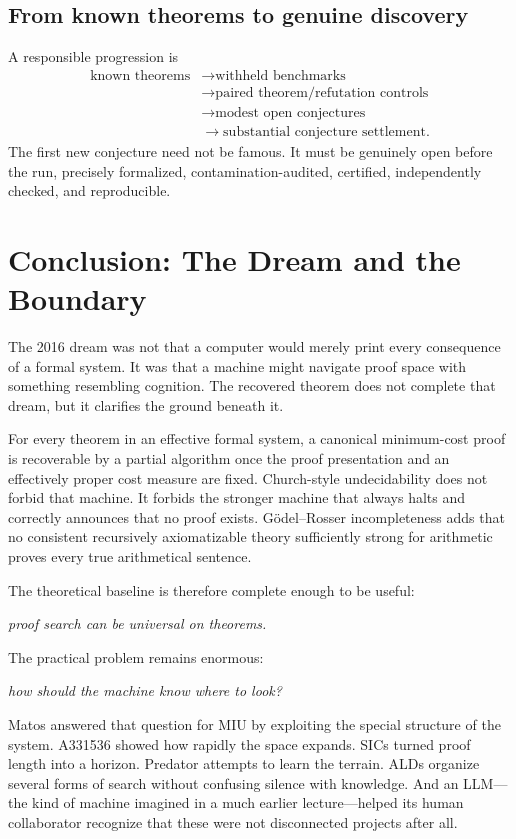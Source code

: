 \documentclass[11pt,oneside]{book}
\theoremstyle{definition}
\theoremstyle{remark}
\begin{document}
\section{From known theorems to genuine discovery}
A responsible progression is
\[
\begin{aligned}
\text{known theorems} &\longrightarrow \text{withheld benchmarks}\\
&\longrightarrow \text{paired theorem/refutation controls}\\
&\longrightarrow \text{modest open conjectures}\\
&\longrightarrow \text{substantial conjecture settlement}.
\end{aligned}
\]
The first new conjecture need not be famous. It must be genuinely open before the run, precisely formalized, contamination-audited, certified, independently checked, and reproducible.

\chapter{Conclusion: The Dream and the Boundary}
The 2016 dream was not that a computer would merely print every consequence of a formal system. It was that a machine might navigate proof space with something resembling cognition. The recovered theorem does not complete that dream, but it clarifies the ground beneath it.

For every theorem in an effective formal system, a canonical minimum-cost proof is recoverable by a partial algorithm once the proof presentation and an effectively proper cost measure are fixed. Church-style undecidability does not forbid that machine. It forbids the stronger machine that always halts and correctly announces that no proof exists. G\"odel--Rosser incompleteness adds that no consistent recursively axiomatizable theory sufficiently strong for arithmetic proves every true arithmetical sentence.

The theoretical baseline is therefore complete enough to be useful:
\begin{center}
\emph{proof search can be universal on theorems.}
\end{center}
The practical problem remains enormous:
\begin{center}
\emph{how should the machine know where to look?}
\end{center}
Matos answered that question for MIU by exploiting the special structure of the system. A331536 showed how rapidly the space expands. SICs turned proof length into a horizon. Predator attempts to learn the terrain. ALDs organize several forms of search without confusing silence with knowledge. And an LLM---the kind of machine imagined in a much earlier lecture---helped its human collaborator recognize that these were not disconnected projects after all.
\end{document}
